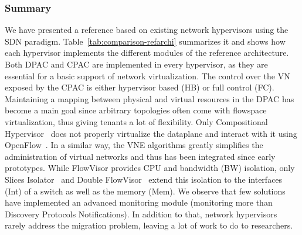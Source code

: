 \subsubsection{Summary}
We have presented a reference based on existing network hypervisors using the SDN paradigm.
Table~\ref{tab:comparison-refarchi} summarizes it and shows how each hypervisor implements the different modules of the reference architecture.
Both DPAC and CPAC are implemented in every hypervisor, as they are essential for a basic support of network virtualization.
The control over the VN exposed by the CPAC is either hypervisor based (HB) or full control (FC).
Maintaining a mapping between physical and virtual resources in the DPAC has become a main goal since arbitrary topologies often come with flowspace virtualization, thus giving tenants a lot of flexibility.
Only Compositional Hypervisor~\cite{CompositionalHypervisor-Jin2014} does not properly virtualize the dataplane and interact with it using OpenFlow~\cite{Openflow-McKeown2008}.
In a similar way, the VNE algorithms greatly simplifies the administration of virtual networks and thus has been integrated since early prototypes.
While FlowVisor provides CPU and bandwidth (BW) isolation, only Slices Isolator~\cite{SlicesIsolator-El-Azzab2011} and Double FlowVisor~\cite{DoubleFV-Yin2013} extend this isolation to the interfaces (Int) of a switch as well as the memory (Mem).
We observe that few solutions have implemented an advanced monitoring module (\ie monitoring more than Discovery Protocols Notifications).
In addition to that, network hypervisors rarely address the migration problem, leaving a lot of work to do to researchers.


